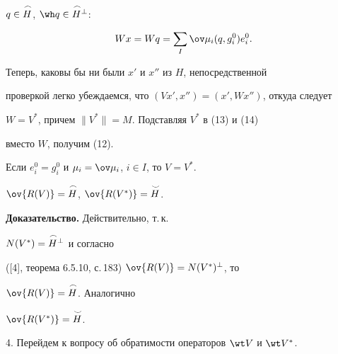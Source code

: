 \begin{pf}
$q\in\overset{\,\frown}{H}{}$, $\wh q\in\up{\frown}{H}^\bot$: 


\begin{equation} 


W x=W q=\sum_I\ov\mu_i(q,g^0_i)e^0_i. 


\end{equation} 


Теперь, каковы бы ни были $x'$ и $x''$ из $H$, непосредственной 


проверкой легко убеждаемся, что $(V x',x'')=(x',W x'')$, откуда следует


$W=V^*$, причем $\|V^*\|=M$. Подставляя $V^*$ в (13) и (14) 


вместо $W$, получим (12). 


\end{pf} 


 


\begin{cor} 


Если $e^0_i=g^0_i$ и $\mu_i=\ov\mu_i$, $i\in I$, то $V=V^*$. 


\end{cor} 


 


\begin{lem} 


$\ov{R(V)}=\up{\frown}{H}$, $\ov{R(V^*)}=\up{\smile}{H}$. 


\end{lem} 


 


{\bf Доказательство.} Действительно, т.\,к. 


$N(V^*)=\overset{\,\frown}{H}{}^\bot$ и согласно 


([4], теорема 6.5.10, с.\,183) $\ov{R(V)}=N(V^*)^\bot$, то 


$\ov{R(V)}=\up{\frown}{H}$. Аналогично 


$\ov{R(V^*)}=\up{\smile}{H}$. 


\medskip 


 


4. Перейдем к вопросу об обратимости операторов $\wt V$ и $\wt V^*$. 


 


